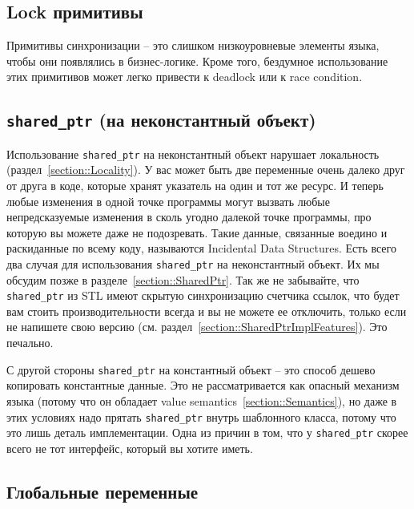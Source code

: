 \subsection{Lock примитивы}

Примитивы синхронизации -- это слишком низкоуровневые элементы языка, чтобы они появлялись в бизнес-логике.
Кроме того, бездумное использование этих примитивов может легко привести к deadlock или к race condition.

\subsection{\texttt{shared\_ptr} (на неконстантный объект)}
\label{item::SharedPtr}

Использование \verb"shared_ptr" на неконстантный объект нарушает локальность (раздел~\ref{section::Locality}).
У вас может быть две переменные очень далеко друг от друга в коде, которые хранят указатель на один и тот же ресурс.
И теперь любые изменения в одной точке программы могут вызвать любые непредсказуемые изменения в сколь угодно далекой точке программы, про которую вы можете даже не подозревать.
Такие данные, связанные воедино и раскиданные по всему коду, называются Incidental Data Structures.
Есть всего два случая для использования \verb"shared_ptr" на неконстантный объект.
Их мы обсудим позже в разделе~\ref{section::SharedPtr}.
Так же не забывайте, что \verb"shared_ptr" из STL имеют скрытую синхронизацию счетчика ссылок, что будет вам стоить производительности всегда и вы не можете ее отключить, только если не напишете свою версию (см. раздел~\ref{section::SharedPtrImplFeatures}).
Это печально.

С другой стороны \verb"shared_ptr" на константный объект -- это способ дешево копировать константные данные.
Это не рассматривается как опасный механизм языка (потому что он обладает value semantics~\ref{section::Semantics}), но даже в этих условиях надо прятать \verb"shared_ptr" внутрь шаблонного класса, потому что это лишь деталь имплементации.
Одна из причин в том, что у \verb"shared_ptr" скорее всего не тот интерфейс, который вы хотите иметь.

\subsection{Глобальные переменные}

